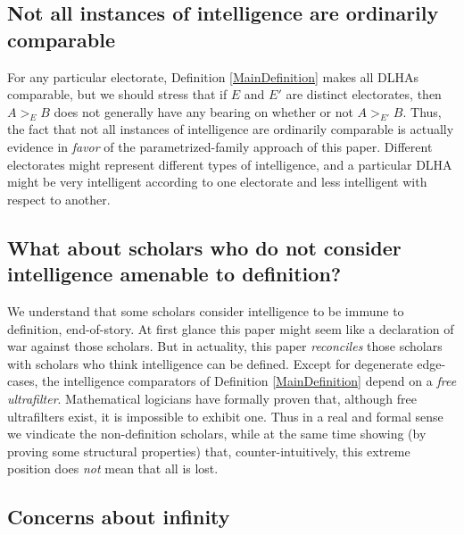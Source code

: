 \documentclass[twoside,11pt]{article}
\begin{document}
\subsection{Not all instances of intelligence are ordinarily comparable}

For any particular electorate, Definition \ref{MainDefinition} makes all
DLHAs comparable, but we should stress that if $E$ and $E'$ are distinct
electorates, then $A>_EB$ does not generally have any bearing on whether
or not $A>_{E'}B$. Thus, the fact that not all instances of intelligence
are ordinarily comparable is actually evidence in \emph{favor} of the
parametrized-family approach of this paper. Different electorates might
represent different types of intelligence, and a particular DLHA might
be very intelligent according to one electorate and less intelligent
with respect to another.

\subsection{What about scholars who do not consider intelligence amenable to definition?}

We understand that some scholars consider intelligence to be immune to
definition, end-of-story. At first glance this paper
might seem like a declaration of war against those
scholars. But in actuality, this paper \emph{reconciles} those
scholars with scholars who think intelligence can be defined.
Except for degenerate edge-cases, the intelligence comparators of
Definition \ref{MainDefinition} depend on a \emph{free ultrafilter}.
Mathematical logicians have formally proven that, although free ultrafilters
exist, it is impossible to exhibit one. Thus in a real and
formal sense we vindicate the non-definition scholars, while at the same
time showing (by proving some structural properties) that, counter-intuitively,
this extreme position does \emph{not} mean that all is lost.

\subsection{Concerns about infinity}
\end{document}
